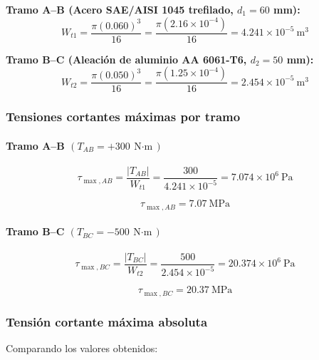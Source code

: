 \documentclass[12pt,a4paper]{article}
\begin{document}
\begin{enumerate}
\textbf{Tramo A--B (Acero SAE/AISI 1045 trefilado, $d_1=60$ mm):}
\begin{equation}
W_{t1}=\frac{\pi(0.060)^3}{16}
=\frac{\pi(2.16\times 10^{-4})}{16}
=4.241\times 10^{-5}\ \text{m}^3
\end{equation}

\textbf{Tramo B--C (Aleación de aluminio AA 6061-T6, $d_2=50$ mm):}
\begin{equation}
W_{t2}=\frac{\pi(0.050)^3}{16}
=\frac{\pi(1.25\times 10^{-4})}{16}
=2.454\times 10^{-5}\ \text{m}^3
\end{equation}

\subsubsection*{Tensiones cortantes máximas por tramo}

\paragraph{Tramo A--B \texorpdfstring{$(T_{AB}=+300\ \text{N$\cdot$m})$}{(TAB = +300 N·m)}}
\begin{equation}
\tau_{\max,AB}=\frac{|T_{AB}|}{W_{t1}}
=\frac{300}{4.241\times 10^{-5}}
=7.074\times 10^6\ \text{Pa}
\end{equation}

\begin{equation}
\boxed{\tau_{\max,AB}=7.07\ \text{MPa}}
\end{equation}

\paragraph{Tramo B--C \texorpdfstring{$(T_{BC}=-500\ \text{N$\cdot$m})$}{(TBC = -500 N·m)}}
\begin{equation}
\tau_{\max,BC}=\frac{|T_{BC}|}{W_{t2}}
=\frac{500}{2.454\times 10^{-5}}
=20.374\times 10^6\ \text{Pa}
\end{equation}

\begin{equation}
\boxed{\tau_{\max,BC}=20.37\ \text{MPa}}
\end{equation}

\subsubsection*{Tensión cortante máxima absoluta}

Comparando los valores obtenidos:


\end{enumerate}
\end{document}
